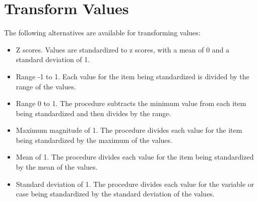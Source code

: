 \documentclass[]{report}
\begin{document}
\section*{Transform Values}
The following alternatives are available for transforming values:
\begin{itemize}
	\item 	Z scores. Values are standardized to z scores, with a mean of 0 and a standard deviation of 1. 
	\item 	Range -1 to 1. Each value for the item being standardized is divided by the range of the values. 
	\item 	Range 0 to 1. The procedure subtracts the minimum value from each item being standardized and then divides by the range. 
	\item 	Maximum magnitude of 1. The procedure divides each value for the item being standardized by the maximum of the values. 
	\item 	Mean of 1. The procedure divides each value for the item being standardized by the mean of the values. 
	\item 	Standard deviation of 1. The procedure divides each value for the variable or case being standardized by the standard deviation of the values.
\end{itemize}
\end{document}
